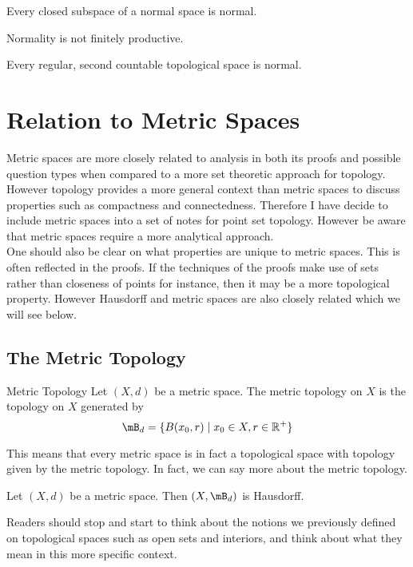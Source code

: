 \documentclass[a4paper]{article}
\begin{document}
\begin{prp}{}{} Every closed subspace of a normal space is normal. 
\end{prp}

\begin{prp}{}{} Normality is not finitely productive. 
\end{prp}

\begin{thm}{}{} Every regular, second countable topological space is normal. 
\end{thm}

\pagebreak
\section{Relation to Metric Spaces}
Metric spaces are more closely related to analysis in both its proofs and possible question types when compared to a more set theoretic approach for topology. However topology provides a more general context than metric spaces to discuss properties such as compactness and connectedness. Therefore I have decide to include metric spaces into a set of notes for point set topology. However be aware that metric spaces require a more analytical approach. \\
One should also be clear on what properties are unique to metric spaces. This is often reflected in the proofs. If the techniques of the proofs make use of sets rather than closeness of points for instance, then it may be a more topological property. However Hausdorff and metric spaces are also closely related which we will see below. 

\subsection{The Metric Topology}
\begin{defn}{Metric Topology}{} Let $(X,d)$ be a metric space. The metric topology on $X$ is the topology on $X$ generated by $$\mB_d=\{B(x_0,r)\;|\;x_0\in X,r\in\R^+\}$$
\end{defn}

This means that every metric space is in fact a topological space with topology given by the metric topology. In fact, we can say more about the metric topology. 

\begin{prp}{}{} Let $(X,d)$ be a metric space. Then $(X,\mB_d)$ is Hausdorff. 
\end{prp}

Readers should stop and start to think about the notions we previously defined on topological spaces such as open sets and interiors, and think about what they mean in this more specific context. 
\end{document}
